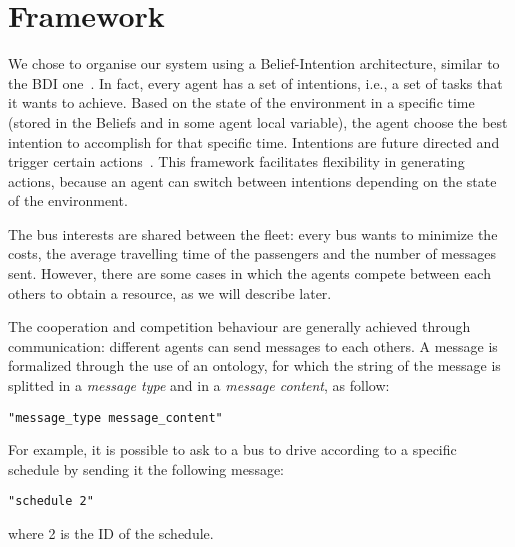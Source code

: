 \section{Framework}

We chose to organise our system using a Belief-Intention architecture, similar to the BDI one~\cite{caillou2017simple}. In fact, every agent has a set of intentions, i.e.,  a set of tasks that it wants to achieve. Based on the state of the environment in a specific time (stored in the Beliefs and in some agent local variable), the agent choose the best intention to accomplish for that specific time. Intentions are future directed and trigger certain actions~\cite{multiagentsystems}. This framework facilitates flexibility in generating actions, because an agent can switch between intentions depending on the state of the environment. 

The bus interests are shared between the fleet: every bus wants to minimize the costs, the average travelling time of the passengers and the number of messages sent. However, there are some cases in which the agents compete between each others to obtain a resource, as we will describe later.

The cooperation and competition behaviour are generally achieved through communication: different agents can send messages to each others. A message is formalized through the use of an ontology, for which the string of the message is splitted in a \textit{message type} and in a \textit{message content}, as follow:

\begin{verbatim}
"message_type message_content"
\end{verbatim}

For example, it is possible to ask to a bus to drive according to a specific schedule by sending it the following message:

\begin{verbatim}
"schedule 2"
\end{verbatim}

where 2 is the ID of the schedule.
